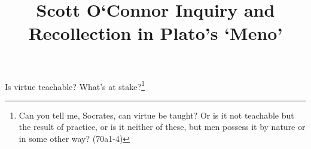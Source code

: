 \documentclass{tufte-handout}
\title{\Large{Scott O`Connor  \hfill Inquiry and Recollection in Plato's `Meno'}}
\begin{document}
\thispagestyle{fancy}

\Large {} Is virtue teachable? What's at stake?\footnote{\small{Can you tell me, Socrates, can virtue be taught? Or is it not teachable but the result of practice, or is it neither of these, but men possess it by nature or in some other way? (70a1-4)}}
 
\end{document}
